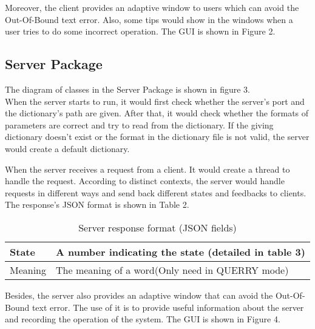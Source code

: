 \documentclass[a4paper]{article}
\begin{document}
Moreover, the client provides an adaptive window to users which can avoid the Out-Of-Bound text error. Also, some tips would show in the windows when a user tries to do some incorrect operation. The GUI is shown in Figure 2.

\newpage
\subsection{Server Package}
The diagram of classes in the Server Package is shown in figure 3.\\


When the server starts to run, it would first check whether the server's port and the dictionary's path are given. After that, it would check whether the formats of parameters are correct and try to read from the dictionary. If the giving dictionary doesn't exist or the format in the dictionary file is not valid, the server would create a default dictionary.

When the server receives a request from a client. It would create a thread to handle the request. According to distinct contexts, the server would handle requests in different ways and send back different states and feedbacks to clients. The response's JSON format is shown in Table 2.

\begin{table}[H]
	\caption{Server response format (JSON fields)}
	\begin{tabular}{|p{1.3cm}|p{10cm}|}
		\hline
		State & A number indicating the state (detailed in table 3)                            \\ \hline
		Meaning & The meaning of a word(Only need in QUERRY mode)                               \\ \hline
	\end{tabular}
\end{table}

Besides, the server also provides an adaptive window that can avoid the Out-Of-Bound text error. The use of it is to provide useful information about the server and recording the operation of the system. The GUI is shown in Figure 4.
\end{document}
